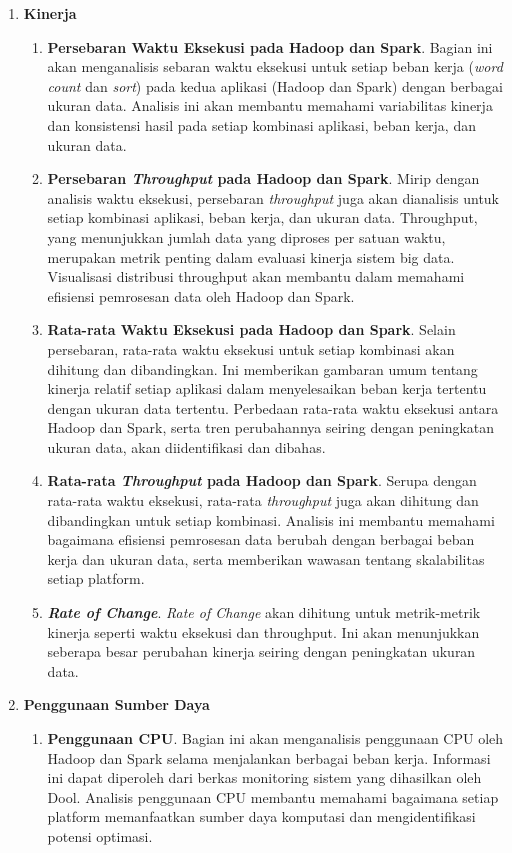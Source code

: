 \begin{enumerate}	
	\item \textbf{Kinerja}
	\begin{enumerate}
		\item \textbf{Persebaran Waktu Eksekusi pada Hadoop dan Spark}. Bagian ini akan menganalisis sebaran waktu eksekusi untuk setiap beban kerja (\textit{word count} dan \textit{sort}) pada kedua aplikasi (Hadoop dan Spark) dengan berbagai ukuran data. Analisis ini akan membantu memahami variabilitas kinerja dan konsistensi hasil pada setiap kombinasi aplikasi, beban kerja, dan ukuran data.
		\item \textbf{Persebaran \textit{Throughput} pada Hadoop dan Spark}. Mirip dengan analisis waktu eksekusi, persebaran \textit{throughput} juga akan dianalisis untuk setiap kombinasi aplikasi, beban kerja, dan ukuran data. Throughput, yang menunjukkan jumlah data yang diproses per satuan waktu,  merupakan metrik penting dalam evaluasi kinerja sistem big data.  Visualisasi distribusi throughput akan membantu dalam memahami efisiensi pemrosesan data oleh Hadoop dan Spark.
		\item \textbf{Rata-rata Waktu Eksekusi pada Hadoop dan Spark}. Selain persebaran, rata-rata waktu eksekusi untuk setiap kombinasi akan dihitung dan dibandingkan.  Ini memberikan gambaran umum tentang kinerja relatif setiap aplikasi dalam menyelesaikan beban kerja tertentu dengan ukuran data tertentu. Perbedaan rata-rata waktu eksekusi antara Hadoop dan Spark, serta tren perubahannya seiring dengan peningkatan ukuran data, akan diidentifikasi dan dibahas.
		\item \textbf{Rata-rata \textit{Throughput} pada Hadoop dan Spark}. Serupa dengan rata-rata waktu eksekusi, rata-rata \textit{throughput} juga akan dihitung dan dibandingkan untuk setiap kombinasi. Analisis ini membantu memahami bagaimana efisiensi pemrosesan data berubah dengan berbagai beban kerja dan ukuran data, serta memberikan wawasan tentang skalabilitas setiap platform.
		\item \textbf{\textit{Rate of Change}}. \textit{Rate of Change} akan dihitung untuk metrik-metrik kinerja seperti waktu eksekusi dan throughput. Ini akan menunjukkan seberapa besar perubahan kinerja seiring dengan peningkatan ukuran data.  
	\end{enumerate}
	\item \textbf{Penggunaan Sumber Daya}
	\begin{enumerate}
	\item \textbf{Penggunaan CPU}. Bagian ini akan menganalisis penggunaan CPU oleh Hadoop dan Spark selama menjalankan berbagai beban kerja.  Informasi ini dapat diperoleh dari berkas monitoring sistem yang dihasilkan oleh Dool.  Analisis penggunaan CPU membantu memahami bagaimana setiap platform memanfaatkan sumber daya komputasi dan mengidentifikasi potensi optimasi.

\end{enumerate}
\end{enumerate}
